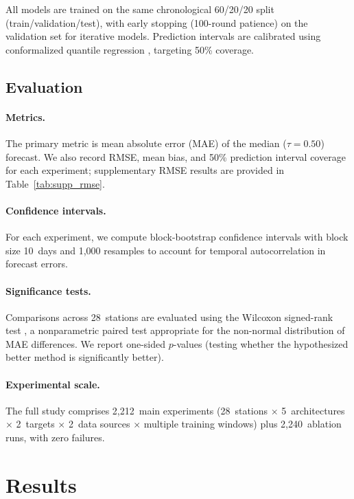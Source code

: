 \documentclass[12pt, letterpaper]{article}
\begin{document}
All models are trained on the same chronological 60/20/20 split (train/validation/test),
with early stopping (100-round patience) on the validation set for iterative models.
Prediction intervals are calibrated using conformalized quantile regression
\citep{romano2019conformal}, targeting 50\% coverage.

\subsection{Evaluation}
\label{sec:evaluation}

\paragraph{Metrics.}
The primary metric is mean absolute error (MAE) of the median ($\tau = 0.50$)
forecast. We also record RMSE, mean bias, and 50\% prediction interval coverage
for each experiment; supplementary RMSE results are provided in Table~\ref{tab:supp_rmse}.

\paragraph{Confidence intervals.}
For each experiment, we compute block-bootstrap confidence intervals
\citep{kunsch1989jackknife} with block size 10~days and 1{,}000 resamples to
account for temporal autocorrelation in forecast errors.

\paragraph{Significance tests.}
Comparisons across 28~stations are evaluated using the Wilcoxon signed-rank test
\citep{wilcoxon1945individual}, a nonparametric paired test appropriate for the
non-normal distribution of MAE differences. We report one-sided $p$-values
(testing whether the hypothesized better method is significantly better).

\paragraph{Experimental scale.}
The full study comprises 2{,}212~main experiments (28~stations $\times$
5~architectures $\times$ 2~targets $\times$ 2~data sources $\times$ multiple
training windows) plus 2{,}240~ablation runs, with zero failures.

\section{Results}
\label{sec:results}
\end{document}
